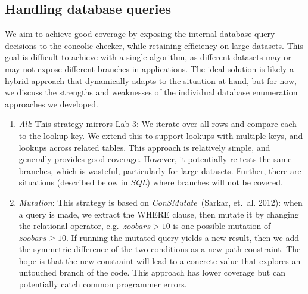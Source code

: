 \documentclass{article}
\begin{document}
\subsection{Handling database queries}

We aim to achieve good coverage
by exposing the internal database query decisions to the concolic checker, while retaining
efficiency on large datasets. This goal is difficult to achieve with a single
algorithm, as different datasets may or may not expose different branches in
applications. The ideal solution is likely a hybrid approach that dynamically adapts to
the situation at hand, but for now, we discuss the strengths and weaknesses of
the individual database enumeration approaches we developed.

\begin{enumerate}
\item \textit{All}:
  This strategy mirrors Lab 3: We iterate over all rows and compare each to the lookup
  key.
  We extend this 
  to support lookups with multiple keys, and lookups across
  related tables.
  This approach is relatively simple, and generally provides good
  coverage. However, it potentially re-tests the same branches,
  which is wasteful, particularly for large datasets. Further, there are situations (described
  below in \textit{SQL}) where branches will not be covered.

\item \textit{Mutation}:
  This strategy is based on \textit{ConSMutate}~(Sarkar,
  et.\ al. 2012): when a query is made, we extract the WHERE clause,
  then mutate it by changing the relational operator, e.g.\, 
  $zoobars > 10$ is one possible mutation of $zoobars \geq 10$.
  If running the mutated query yields a new result, then we
  add the symmetric difference of the two conditions as a new path
  constraint. The hope is that the new constraint will lead to a
  concrete value that explores an untouched branch of the code. This
  approach has lower coverage but can potentially catch common
  programmer errors.


\end{enumerate}
\end{document}
